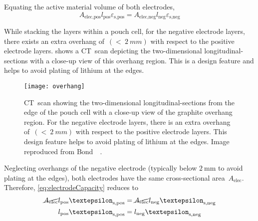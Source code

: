 Equating  the active material volume of both electrodes,
\begin{equation}
    A_\text{elec,pos}l_\text{pos}  \varepsilon_\text{s,pos} = A_\text{elec,neg}l_\text{neg}  \varepsilon_\text{s,neg} \label{eq:electrodeCapacity}
\end{equation}

While  stacking the  layers  within a  pouch cell,  for  the negative  electrode
layers, there exists  an extra overhang of~${(<~\SI{2}{mm})}$ with  respect to the
positive  electrode layers.    shows a  CT~scan
depicting the two-dimensional longitudinal-sections with a close-up view of this
overhang region. This is a design feature  and helps to avoid plating of lithium
at the edges.

\begin{figure}[!htbp]
    \centering
    \texttt{[image: overhang]}
    \caption[Stacking of layers within a pouch cell showing overhang of negative
    electrode]
    {CT~scan showing the two-dimensional longitudinal-sections from the edge of
        the pouch cell with a close-up view of the graphite overhang region. For
        the negative electrode layers, there is an extra overhang of~${(<~\SI{2}{mm})}$ with respect to the positive electrode layers. This
        design feature helps to avoid plating of lithium at the edges. Image
    reproduced from Bond~\etal~\cite{Bond2017}.}
    \label{fig:anodeoverhangpouchcell}
\end{figure}

Neglecting   overhangs    of   the    negative   electrode    (typically   below
$\SI{2}{\milli\meter}$    to    avoid    plating    at    the    edges),    both
electrodes  have  the   same  cross-sectional  area~$A_\text{elec}$.  Therefore,
\cref{eq:electrodeCapacity} reduces to
\begin{align}
    \cancel{A_\text{elec}}l_\text{pos}  \varepsilon_\text{s,pos} & = \cancel{A_\text{elec}}l_\text{neg}  \varepsilon_\text{s,neg}  \\
    l_\text{pos}  \varepsilon_\text{s,pos}                       & = l_\text{neg}  \varepsilon_\text{s,neg}\label{eq:electrodeCapequalarea}
\end{align}


